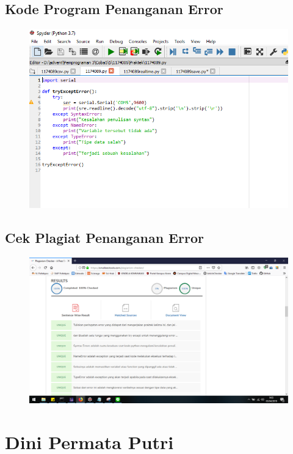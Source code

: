\subsection{Kode Program Penanganan Error}
\begin{figure}[H]
	\includegraphics[width=12cm]{figures/5/1174089/Praktek/error.png}
	\centering
\end{figure}

\subsection{Cek Plagiat Penanganan Error}
\begin{figure}[H]
	\includegraphics[width=12cm]{figures/5/1174089/Praktek/plagiaterror.png}
	\centering
\end{figure}
\section{Dini Permata Putri}
